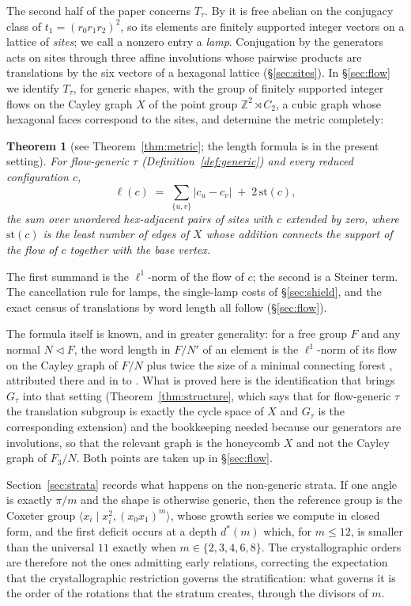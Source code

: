 \documentclass[11pt]{article}
\newtheorem{theorem}{Theorem}[section]
\theoremstyle{definition}
\theoremstyle{remark}
\newcommand{\Z}{\mathbb{Z}}
\begin{document}
The second half of the paper concerns $T_\tau$. By \cite[Thm.~4.1]{IP} it is free
abelian on the conjugacy class of $t_1=(r_0r_1r_2)^2$, so its elements are
finitely supported integer vectors on a lattice of \emph{sites}; we call a
nonzero entry a \emph{lamp}. Conjugation by the generators acts on sites through
three affine involutions whose pairwise products are translations by the six
vectors of a hexagonal lattice (\S\ref{sec:sites}). In \S\ref{sec:flow} we
identify $T_\tau$, for generic shapes, with the group of finitely supported
integer flows on the Cayley graph $X$ of the point group $\Z^2\rtimes C_2$, a
cubic graph whose hexagonal faces correspond to the sites, and determine the
metric completely:

\begin{theorem}[{see Theorem~\ref{thm:metric}; the length formula is
\cite[Thm.~2.10]{MRUV} in the present setting}]\label{thm:introm}
For flow-generic $\tau$ (Definition~\ref{def:generic}) and every reduced
configuration $c$,
\[
 \ell(c)\;=\;\sum_{\{u,v\}}|c_u-c_v|\;+\;2\,\mathrm{st}(c),
\]
the sum over unordered hex-adjacent pairs of sites with $c$ extended by zero,
where $\mathrm{st}(c)$ is the least number of edges of $X$ whose addition
connects the support of the flow of $c$ together with the base vertex.
\end{theorem}

The first summand is the $\ell^1$-norm of the flow of $c$; the second is a
Steiner term. The cancellation rule for lamps, the single-lamp costs of
\S\ref{sec:shield}, and the exact census of translations by word length all
follow (\S\ref{sec:flow}).

The formula itself is known, and in greater generality: for a free group $F$ and
any normal $N\vartriangleleft F$, the word length in $F/N'$ of an element is the
$\ell^1$-norm of its flow on the Cayley graph of $F/N$ plus twice the size of a
minimal connecting forest \cite[Thm.~2.10]{MRUV}, attributed there and in
\cite[Lem.~3.2]{Sale} to \cite{DLS}. What is proved here is the identification
that brings $G_\tau$ into that setting (Theorem~\ref{thm:structure}, which
says that for flow-generic $\tau$ the translation subgroup is exactly the cycle
space of $X$ and $G_\tau$ is the corresponding extension) and the
bookkeeping needed because our generators are involutions, so that the relevant
graph is the honeycomb $X$ and not the Cayley graph of $F_3/N$. Both points are
taken up in \S\ref{sec:flow}.

Section~\ref{sec:strata} records what happens on the non-generic strata. If one
angle is exactly $\pi/m$ and the shape is otherwise generic, then the reference
group is the Coxeter group $\langle x_i\mid x_i^2,(x_0x_1)^m\rangle$, whose
growth series we compute in closed form, and the first deficit occurs at a
depth $d^*(m)$ which, for $m\le12$, is smaller than the universal $11$ exactly
when $m\in\{2,3,4,6,8\}$. The crystallographic orders are therefore not the
ones admitting early relations, correcting the expectation that the
crystallographic restriction governs the stratification: what governs it is
the order of the rotations that the stratum creates, through the divisors of
$m$.
\end{document}
